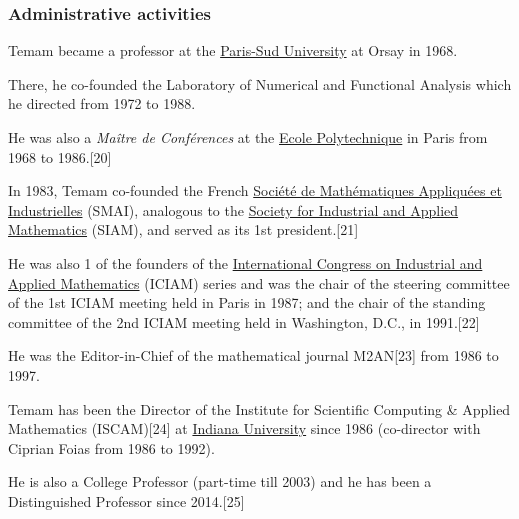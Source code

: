 \documentclass{article}
\begin{document}
\subsubsection{Administrative activities}
Temam became a professor at the \href{https://en.wikipedia.org/wiki/Paris-Sud_University}{Paris-Sud University} at Orsay in 1968.

There, he co-founded the Laboratory of Numerical and Functional Analysis which he directed from 1972 to 1988.

He was also a \textit{Maître de Conférences} at the \href{https://en.wikipedia.org/wiki/Ecole_Polytechnique}{Ecole Polytechnique} in Paris from 1968 to 1986.[20]

%
In 1983, Temam co-founded the French \href{https://en.wikipedia.org/wiki/Soci%C3%A9t%C3%A9_de_Math%C3%A9matiques_Appliqu%C3%A9es_et_Industrielles}{Société de Mathématiques Appliquées et Industrielles} (SMAI), analogous to the \href{https://en.wikipedia.org/wiki/Society_for_Industrial_and_Applied_Mathematics}{Society for Industrial and Applied Mathematics} (SIAM), and served as its 1st president.[21]

He was also 1 of the founders of the \href{https://en.wikipedia.org/wiki/International_Congress_on_Industrial_and_Applied_Mathematics}{International Congress on Industrial and Applied Mathematics} (ICIAM) series and was the chair of the steering committee of the 1st ICIAM meeting held in Paris in 1987; and the chair of the standing committee of the 2nd ICIAM meeting held in Washington, D.C., in 1991.[22]

He was the Editor-in-Chief of the mathematical journal M2AN[23] from 1986 to 1997.

%
Temam has been the Director of the Institute for Scientific Computing \& Applied Mathematics (ISCAM)[24] at \href{https://en.wikipedia.org/wiki/Indiana_University_Bloomington}{Indiana University} since 1986 (co-director with Ciprian Foias from 1986 to 1992).

He is also a College Professor (part-time till 2003) and he has been a Distinguished Professor since 2014.[25]
\end{document}
